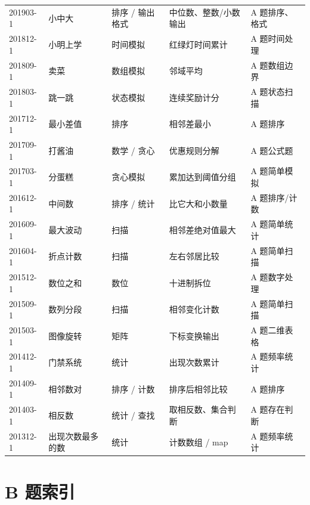 \begin{longtable}{p{1.8cm}p{2.8cm}p{2.6cm}p{3.5cm}p{3.5cm}}
201903-1 & 小中大 & 排序 / 输出格式 & 中位数、整数/小数输出 & A 题排序、格式 \\
201812-1 & 小明上学 & 时间模拟 & 红绿灯时间累计 & A 题时间处理 \\
201809-1 & 卖菜 & 数组模拟 & 邻域平均 & A 题数组边界 \\
201803-1 & 跳一跳 & 状态模拟 & 连续奖励计分 & A 题状态扫描 \\
201712-1 & 最小差值 & 排序 & 相邻差最小 & A 题排序 \\
201709-1 & 打酱油 & 数学 / 贪心 & 优惠规则分解 & A 题公式题 \\
201703-1 & 分蛋糕 & 贪心模拟 & 累加达到阈值分组 & A 题简单模拟 \\
201612-1 & 中间数 & 排序 / 统计 & 比它大和小数量 & A 题排序/计数 \\
201609-1 & 最大波动 & 扫描 & 相邻差绝对值最大 & A 题简单统计 \\
201604-1 & 折点计数 & 扫描 & 左右邻居比较 & A 题简单扫描 \\
201512-1 & 数位之和 & 数位 & 十进制拆位 & A 题数字处理 \\
201509-1 & 数列分段 & 扫描 & 相邻变化计数 & A 题简单扫描 \\
201503-1 & 图像旋转 & 矩阵 & 下标变换输出 & A 题二维表格 \\
201412-1 & 门禁系统 & 统计 & 出现次数累计 & A 题频率统计 \\
201409-1 & 相邻数对 & 排序 / 计数 & 排序后相邻比较 & A 题排序 \\
201403-1 & 相反数 & 统计 / 查找 & 取相反数、集合判断 & A 题存在判断 \\
201312-1 & 出现次数最多的数 & 统计 & 计数数组 / map & A 题频率统计 \\
\bottomrule
\end{longtable}
\endgroup

\section{B 题索引}

